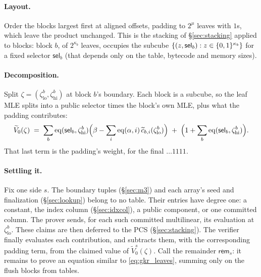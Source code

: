 \paragraph{Layout.} Order the blocks largest first at aligned offsets, padding to $2^{\mu}$ leaves with $1$s, which leave the product unchanged. This is the stacking of \S\ref{sec:stacking} applied to blocks: block $b$, of $2^{\kappa_b}$ leaves, occupies the subcube $\{(z,\mathsf{sel}_b):z\in\{0,1\}^{\kappa_b}\}$ for a fixed selector $\mathsf{sel}_b$ (that depends only on the table, bytecode and memory sizes).

\paragraph{Decomposition.} Split $\zeta=(\zeta^{b}_{\mathrm{lo}},\zeta^{b}_{\mathrm{hi}})$ at block $b$'s boundary. Each block is a subcube, so the leaf MLE splits into a public selector times the block's own MLE, plus what the padding contributes:
\begin{equation}\label{eq:gkr_leaves}
  \widetilde V_0(\zeta)\;=\;\sum_b \operatorname{eq}(\mathsf{sel}_b,\zeta^{b}_{\mathrm{hi}})\Bigl(\beta-\sum_{i}\operatorname{eq}(\alpha,i)\,\widetilde c_{b,i}(\zeta^{b}_{\mathrm{lo}})\Bigr)\;+\;\Bigl(1+\sum_b\operatorname{eq}(\mathsf{sel}_b,\zeta^{b}_{\mathrm{hi}})\Bigr).
\end{equation}
That last term is the padding's weight, for the final $\dots 1111$.

\paragraph{Settling it.} Fix one side $s$. The boundary tuples (\S\ref{sec:m3}) and each array's seed and finalization (\S\ref{sec:lookup}) belong to no table. Their entries have degree one: a constant, the index column (\S\ref{sec:idxcol}), a public component, or one committed column. The prover sends, for each such committed multilinear, its evaluation at $\zeta^{b}_{\mathrm{lo}}$. These claims are then deferred to the PCS (\S\ref{sec:stacking}). The verifier finally evaluates each contribution, and subtracts them, with the corresponding padding term, from the claimed value of $\widetilde V^{s}_0(\zeta)$. Call the remainder $\mathsf{rem}_{s}$: it remains to prove an equation similar to \eqref{eq:gkr_leaves}, summing only on the flush blocks from tables.

